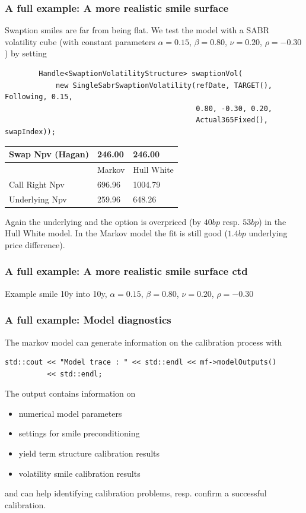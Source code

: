 \documentclass{beamer}
\begin{document}
\begin{frame}[fragile]
\frametitle{A full example: A more realistic smile surface}
Swaption smiles are far from being flat. We test the model with a SABR volatility cube
(with constant parameters $\alpha=0.15$, $\beta=0.80$, $\nu=0.20$, $\rho=-0.30$) by setting

\begin{verbatim}
        Handle<SwaptionVolatilityStructure> swaptionVol(
            new SingleSabrSwaptionVolatility(refDate, TARGET(), Following, 0.15,
                                             0.80, -0.30, 0.20,
                                             Actual365Fixed(), swapIndex));
\end{verbatim}

\begin{table}[ht]
\begin{tabular}{l|l|l}
Swap Npv (Hagan) & 246.00 & 246.00\\ \hline
 & Markov & Hull White \\ \hline
Call Right Npv   & 696.96 & 1004.79 \\
Underlying Npv   & 259.96 & 648.26 \\
\end{tabular}
\end{table}

Again the underlying and the option is overpriced (by $40 bp$ resp. $53 bp$) in the Hull White model.
In the Markov model the fit is still good ($1.4bp$ underlying price difference).
\end{frame}


\begin{frame}[fragile]
\frametitle{A full example: A more realistic smile surface ctd}

Example smile 10y into 10y, $\alpha=0.15$, $\beta=0.80$, $\nu=0.20$, $\rho=-0.30$

\end{frame}

\begin{frame}[fragile]
\frametitle{A full example: Model diagnostics}
The markov model can generate information on the calibration process with
\begin{verbatim}
std::cout << "Model trace : " << std::endl << mf->modelOutputs() 
          << std::endl;
\end{verbatim}
The output contains information on
\begin{itemize}
\item numerical model parameters
\item settings for smile preconditioning
\item yield term structure calibration results
\item volatility smile calibration results
\end{itemize}
and can help identifying calibration problems, resp. confirm a successful calibration.
\end{frame}
\end{document}
